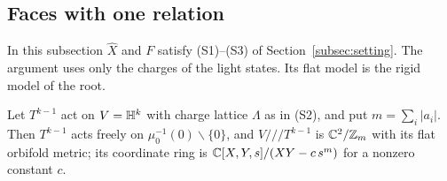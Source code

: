 \subsection{Faces with one relation}
\label{subsec:general}

In this subsection $\widehat X$ and $F$ satisfy (S1)--(S3) of Section~\ref{subsec:setting}. The
argument uses only the charges of the light states. Its flat model is the rigid model of the
root.

\begin{lemma}\label{lem:flat-model}
Let $T^{k-1}$ act on $V=\mathbb H^k$ with charge lattice $\Lambda$ as in (S2), and put
$m=\sum_i|a_i|$. Then $T^{k-1}$ acts freely on $\mu_0^{-1}(0)\smallsetminus\{0\}$, and
$V/\!/\!/T^{k-1}$ is $\mathbb C^2/\mathbb Z_m$ with its flat orbifold metric; its coordinate ring is
$\mathbb C[X,Y,s]/(XY-c\,s^m)$ for a nonzero constant $c$.
\end{lemma}

